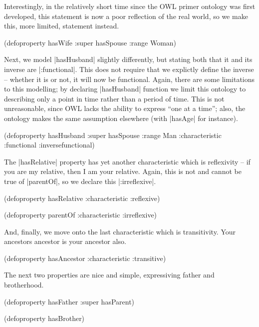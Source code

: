 Interestingly, in the relatively short time since the OWL primer
ontology was first developed, this statement is now a poor reflection
of the real world, so we make this, more limited, statement instead.

\begin{tawny}
(defoproperty hasWife
  :super hasSpouse
  :range Woman)
\end{tawny}

Next, we model |hasHusband| slightly differently, but stating both
that it and its inverse are |:functional|. This does not require that
we explictly define the inverse -- whether it is or not, it will now
be functional. Again, there are some limitations to this modelling; by
declaring |hasHusband| function we limit this ontology to describing
only a point in time rather than a period of time. This is not
unreasonable, since OWL lacks the ability to express ``one at a
time''; also, the ontology makes the same assumption elsewhere (with
|hasAge| for instance).

\begin{tawny}
(defoproperty hasHusband
  :super hasSpouse
  :range Man
  :characteristic :functional
  :inversefunctional)
\end{tawny}

The |hasRelative| property has yet another characteristic which is
reflexivity -- if you are my relative, then I am your relative. Again,
this is not and cannot be true of |parentOf|, so we declare this
|:irreflexive|.

\begin{tawny}
(defoproperty hasRelative
  :characteristic :reflexive)

(defoproperty parentOf
  :characteristic :irreflexive)
\end{tawny}

And, finally, we move onto the last characteristic which is
transitivity. Your ancestors ancestor is your ancestor also.

\begin{tawny}
(defoproperty hasAncestor
  :characteristic :transitive)
\end{tawny}

The next two properties are nice and simple, expressiving father and
brotherhood.

\begin{tawny}
(defoproperty hasFather
  :super hasParent)

(defoproperty hasBrother)
\end{tawny}

